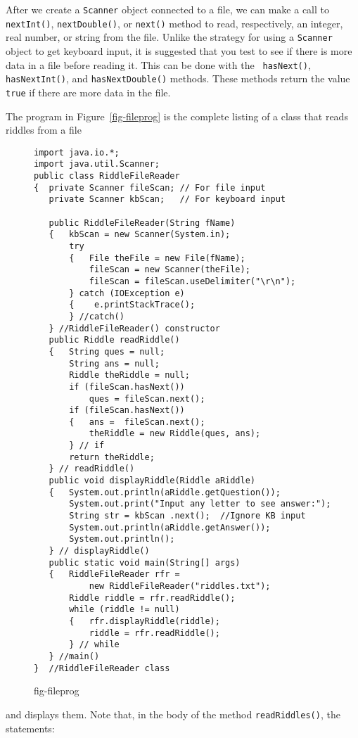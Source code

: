 After we create a {\tt Scanner} object connected to a file, we can
make a call to {\tt nextInt()}, {\tt nextDouble()}, or {\tt next()}
method to read, respectively, an integer, real number, or string from
the file.  Unlike the strategy for using a {\tt Scanner} object to get
keyboard input, it is suggested that you test to see if there is more
data in a file before reading it.  This can be done with the {\tt
hasNext()}, {\tt hasNextInt()}, and {\tt hasNextDouble()} methods.
These methods return the value {\tt true} if there are more data in the
file.

The program in Figure~\ref{fig-fileprog}
is the complete listing of a class that reads riddles from a file
\begin{figure}[h!]
\jjjprogstart
\begin{jjjlisting}[26.5pc]
\begin{lstlisting}
import java.io.*;
import java.util.Scanner;
public class RiddleFileReader
{  private Scanner fileScan; // For file input
   private Scanner kbScan;   // For keyboard input

   public RiddleFileReader(String fName)
   {   kbScan = new Scanner(System.in);
       try
       {   File theFile = new File(fName);
           fileScan = new Scanner(theFile);
           fileScan = fileScan.useDelimiter("\r\n");
       } catch (IOException e)
       {    e.printStackTrace();
       } //catch()
   } //RiddleFileReader() constructor
   public Riddle readRiddle()
   {   String ques = null;
       String ans = null;
       Riddle theRiddle = null;
       if (fileScan.hasNext())
           ques = fileScan.next();
       if (fileScan.hasNext())
       {   ans =  fileScan.next();
           theRiddle = new Riddle(ques, ans);
       } // if
       return theRiddle;
   } // readRiddle()
   public void displayRiddle(Riddle aRiddle)
   {   System.out.println(aRiddle.getQuestion());
       System.out.print("Input any letter to see answer:");
       String str = kbScan .next();  //Ignore KB input
       System.out.println(aRiddle.getAnswer());
       System.out.println();
   } // displayRiddle()
   public static void main(String[] args)
   {   RiddleFileReader rfr =
           new RiddleFileReader("riddles.txt");
       Riddle riddle = rfr.readRiddle();
       while (riddle != null)
       {   rfr.displayRiddle(riddle);
           riddle = rfr.readRiddle();
       } // while
   } //main()
}  //RiddleFileReader class
\end{lstlisting}
\end{jjjlisting}
{fig-fileprog}
\end{figure}
and displays them.  Note that, in the body of the method {\tt readRiddles()},
the statements:

